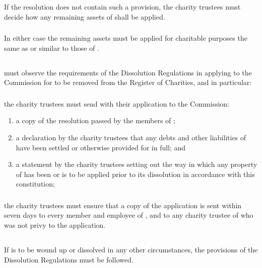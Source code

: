         \subsubsection{}
        If the resolution does not contain such a provision, the charity trustees must decide how any remaining assets of \shortname{} shall be applied.

        \subsubsection{}
        In either case the remaining assets must be applied for charitable purposes the same as or similar to those of \shortname{}.

    \subsection{}
    \shortname{} must observe the requirements of the Dissolution Regulations in applying to the Commission for \shortname{} to be removed from the Register of Charities, and in particular:

        \subsubsection{}
        the charity trustees must send with their application to the Commission:
        \begin{enumerate}
            \item a copy of the resolution passed by the members of \shortname{};
            \item a declaration by the charity trustees that any debts and other liabilities of \shortname{} have been settled or otherwise provided for in full; and
            \item a statement by the charity trustees setting out the way in which any property of \shortname{} has been or is to be applied prior to its dissolution in accordance with this constitution;
        \end{enumerate}

        \subsubsection{}
        the charity trustees must ensure that a copy of the application is sent within seven days to every member and employee of \shortname{}, and to any charity trustee of \shortname{} who was not privy to the application.

    \subsection{}
    If \shortname{} is to be wound up or dissolved in any other circumstances, the provisions of the Dissolution Regulations must be followed.
